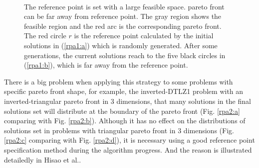 \documentclass[conference]{IEEEtran}
\begin{document}
\begin{figure}[!t]
  \centering
  \quad
  \\
  \caption{The reference point is set with a large feasible space.
  pareto front can be far away from reference point.
  The gray region shows the feasible region and the red arc is the corresponding pareto front.
  The red circle $r$ is the reference point calculated by the initial solutions in (\ref{rpa1:a})
  which is randomly generated.
  After some generations, the current solutions reach to the five black circles in (\ref{rpa1:b}), 
  which is far away from the reference point.}
  \label{rpa1}
\end{figure}

There is a big problem when applying this strategy to some problems with specific pareto front shape, 
for example, the inverted-DTLZ1 problem with an inverted-triangular pareto front in 3 dimensions,
that many solutions in the final solutions set will distribute at the boundary of the pareto front
(Fig. \ref{rpa2:a} comparing with Fig. \ref{rpa2:b})\cite{hisao:RPexplanation, hisao:RPspecify, hisao:dynamic}. 
Although it has no effect on the distributions of solutions set 
in problems with triangular pareto front in 3 dimensions 
(Fig. \ref{rpa2:c} comparing with Fig. \ref{rpa2:d}), 
it is necessary using a good reference point specification method during the algorithm progress.
And the reason is illustrated detailedly in Hisao et al.\cite{hisao:RPexplanation}.
\end{document}
